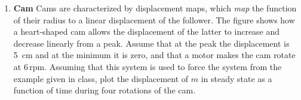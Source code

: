 \documentclass[11pt, english, a4paper, twopage]{article}
\begin{document}
\begin{enumerate}
\begin{minipage}[t][3.5cm]{0.75\textwidth}
 To mitigate its vibration it is damped by four springs of \SI{40}{\kilo\newton\per\metre}, and an oil damper with a coefficient linearly proportional to velocity adjusted so that $c = 0.4 C_c$ ($C_c$, critical damping coefficient).
 Obtain an approximate range of motor operating frequencies where the vibration is less than \SI{0.2}{\milli\metre}.
\end{minipage}
\begin{minipage}[c][2cm][t]{0.2\textwidth}
 \texttt{[image: figures/beer\_fig\_P19\_144]}
\end{minipage}
\item
\begin{minipage}[t][3.5cm]{0.75\textwidth}
 \textbf{Cam}
 Cams are characterized by displacement maps, which \emph{map} the function of their radius to a linear displacement of the follower.
 The figure shows how a heart-shaped cam allows the displacement of the latter to increase and decrease linearly from a peak.
 Assume that at the peak the displacement is \SI{5}{\centi\metre} and at the minimum it is zero, and that a motor makes the cam rotate at $6\,\mathrm{rpm}$.
 Assuming that this system is used to force the system from the example given in class, plot the displacement of $m$ in steady state as a function of time during four rotations of the cam.
\end{minipage}
\begin{minipage}[c][2cm][t]{0.2\textwidth}

\end{minipage}
\end{enumerate}
\end{document}

